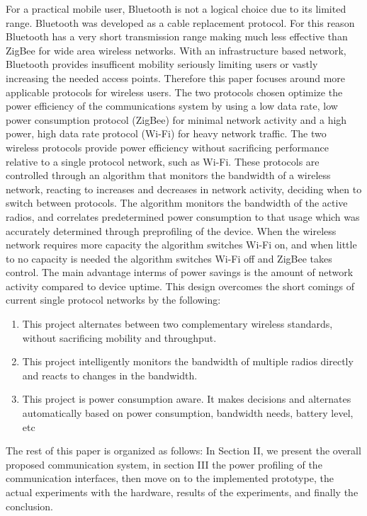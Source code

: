 \documentclass[conference]{IEEEtran}
\begin{document}
For a practical mobile user, Bluetooth is not a logical choice due to its limited range.  Bluetooth was developed as a cable replacement protocol.  For this reason Bluetooth has a very short transmission range making much less effective than ZigBee for wide area wireless networks\cite{thirteen}.  With an infrastructure based network, Bluetooth provides insufficent  mobility seriously limiting users or vastly increasing the needed access points.  Therefore this paper focuses around more applicable protocols for wireless users.  The two protocols chosen optimize the power efficiency of the communications system by using a low data rate, low power consumption protocol (ZigBee) for minimal network activity and a high power, high data rate protocol (Wi-Fi) for heavy network traffic. The two wireless protocols provide power efficiency without sacrificing performance relative to a single protocol network, such as Wi-Fi. These protocols are controlled through an algorithm that monitors the bandwidth of a wireless network, reacting to increases and decreases in network activity, deciding when to switch between protocols. The algorithm monitors the bandwidth of the active radios, and correlates predetermined power consumption to that usage which was accurately determined through preprofiling of the device. When the wireless network requires more capacity the algorithm switches Wi-Fi on, and when little to no capacity is needed the algorithm switches Wi-Fi off and ZigBee takes control.  The main advantage interms of power savings is the amount of network activity compared to device uptime.
This design overcomes the short comings of current single protocol networks by the following:
\begin{enumerate} 
  \item  This project alternates between two complementary wireless standards, without sacrificing mobility and throughput. 
  \item  This project intelligently monitors the bandwidth of multiple radios directly and reacts to changes in the bandwidth. 
  \item  This project is power consumption aware. It makes decisions and alternates automatically based on power consumption, bandwidth needs, battery level, etc 
\end{enumerate}

The rest of this paper is organized as follows: In Section II, we present the overall proposed communication system, in section III the power profiling of the communication interfaces, then move on to the implemented prototype, the actual experiments with the hardware, results of the experiments, and finally the conclusion.
\end{document}
